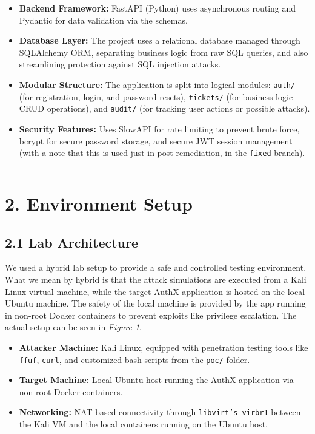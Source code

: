 \documentclass[11pt]{article}
\begin{document}
\begin{itemize}
    \item \textbf{Backend Framework:} FastAPI (Python) uses asynchronous routing and Pydantic for data validation via the schemas.
    \item \textbf{Database Layer:} The project uses a relational database managed through SQLAlchemy ORM, separating business logic from raw SQL queries, and also streamlining protection against SQL injection attacks.
    \item \textbf{Modular Structure:} The application is split into logical modules: \texttt{auth/} (for registration, login, and password resets), \texttt{tickets/} (for business logic CRUD operations), and \texttt{audit/} (for tracking user actions or possible attacks).
    \item \textbf{Security Features:} Uses SlowAPI for rate limiting to prevent brute force, bcrypt for secure password storage, and secure JWT session management (with a note that this is used just in post-remediation, in the \texttt{fixed} branch).
\end{itemize}

\vspace{1em}
\hrule
\vspace{1em}

\section*{2. Environment Setup}

\subsection*{2.1 Lab Architecture}

We used a hybrid lab setup to provide a safe and controlled testing environment. What we mean by hybrid is that the attack simulations are executed from a Kali Linux virtual machine, while the target AuthX application is hosted on the local Ubuntu machine. The safety of the local machine is provided by the app running in non-root Docker containers to prevent exploits like privilege escalation. The actual setup can be seen in \textit{Figure 1}.

\begin{itemize}
    \item \textbf{Attacker Machine:} Kali Linux, equipped with penetration testing tools like \texttt{ffuf}, \texttt{curl}, and customized bash scripts from the \texttt{poc/} folder.
    \item \textbf{Target Machine:} Local Ubuntu host running the AuthX application via non-root Docker containers.
    \item \textbf{Networking:} NAT-based connectivity through \texttt{libvirt's virbr1} between the Kali VM and the local containers running on the Ubuntu host.
\end{itemize}
\end{document}
